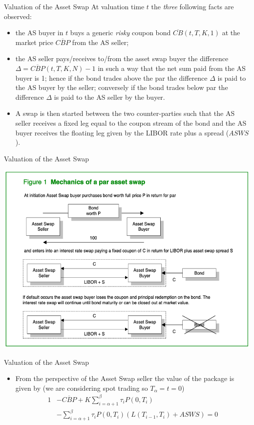 \documentclass{beamer}
\begin{document}
\begin{frame}{Valuation of the Asset Swap}
	At valuation time $t$ the \emph{three} following facts are observed:
	\begin{itemize}
		\item the AS buyer in $t$ buys a generic \emph{risky} coupon bond $\overline{CB}(t,T,K,1)$ at the market price $\overline{CBP}$ from the AS seller;
		\item the AS seller pays/receives to/from the asset swap buyer the difference $\Delta = \overline{CBP}(t,T,K,N)-1$ in such a way that the net sum paid from the AS buyer is 1; hence if the bond trades above the par the difference $\Delta$ is paid to the AS buyer by the seller; conversely if the bond trades below par the difference $\Delta$ is paid to the AS seller by the buyer.
		\item A swap is then started between the two counter-parties such that the AS seller receives a fixed leg equal to the coupon stream of the bond and the AS buyer receives the floating leg given by the LIBOR rate plus a spread ($ASWS$).
	\end{itemize}
\end{frame}

\begin{frame}{Valuation of the Asset Swap}
	\begin{center}
		\includegraphics[width=0.8\linewidth]{asset_swap}
	\end{center}
\end{frame}

\begin{frame}{Valuation of the Asset Swap}
	\begin{itemize}
		\item From the perspective of the Asset Swap seller the value of the package is given by (we are considering spot trading so $T_\alpha = t = 0$)
		\begin{equation}
			\begin{aligned}
				1&-\overline{CBP}+K\sum_{i=\alpha+1}^{\beta}\tau_i P(0,T_i) \\
				&-\sum_{i=\alpha+1}^{\beta}\tau_i P(0,T_i)(L(T_{i-1},T_i)+ASWS)=0
			\end{aligned}
			\label{eq:asset_swap_value}
		\end{equation}
	\end{itemize}
\end{frame}
\end{document}
